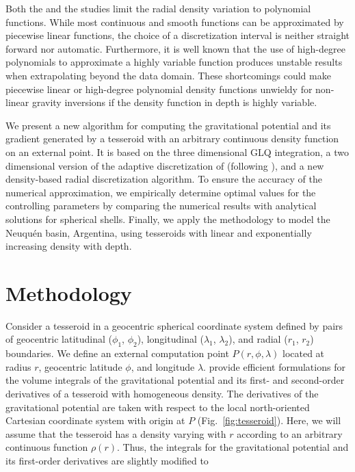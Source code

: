 \documentclass[extra, referee]{gji}
\begin{document}
Both the \citet{Lin2018} and the \citet{Fukushima2018} studies limit the radial density
variation to polynomial functions.
While most continuous and smooth functions can be approximated by piecewise linear
functions, the choice of a discretization interval is neither straight forward nor
automatic.
Furthermore, it is well known that the use of high-degree polynomials to approximate a
highly variable function produces unstable results when extrapolating beyond the data
domain.
These shortcomings could make piecewise linear or high-degree polynomial density
functions unwieldy for non-linear gravity inversions \citep[e.g.][]{Uieda2017} if the
density function in depth is highly variable.

We present a new algorithm for computing the gravitational potential and its gradient
generated by a tesseroid with an arbitrary continuous density function on an external
point.
It is based on the three dimensional GLQ integration, a two dimensional version of the
adaptive discretization of \citet{Uieda2016} (following \citet{Lin2018}),
and a new density-based radial discretization algorithm.
To ensure the accuracy of the numerical approximation, we empirically determine
optimal values for the controlling parameters by comparing the numerical results with
analytical solutions for spherical shells.
Finally, we apply the methodology to model the Neuqu\'en basin, Argentina, using
tesseroids with linear and exponentially increasing density with depth.



\section{Methodology}

Consider a tesseroid in a geocentric spherical coordinate system defined by
pairs of geocentric latitudinal ($\phi_1$, $\phi_2$), longitudinal ($\lambda_1$,
$\lambda_2$), and radial ($r_1$, $r_2$) boundaries.
We define an external computation point $P(r, \phi, \lambda)$ located at radius $r$,
geocentric latitude $\phi$, and longitude $\lambda$.
\citet{Grombein2013} provide efficient formulations for the volume integrals of the
gravitational potential and its first- and second-order derivatives of a tesseroid with
homogeneous density.
The derivatives of the gravitational potential are taken with
respect to the local north-oriented Cartesian coordinate system with origin at $P$
(Fig.~\ref{fig:tesseroid}).
Here, we will assume that the tesseroid has a density varying with $r$ according to an
arbitrary continuous function $\rho(r)$.
Thus, the integrals for the gravitational potential and its first-order derivatives are
slightly modified to
\end{document}
